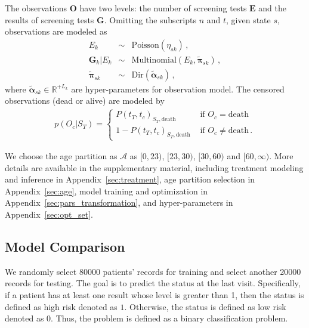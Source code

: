 \documentclass{article}
\begin{document}
The observations $\bm O$ have two levels: the number of screening tests $\bm E$ and the results of screening tests $\bm G$. Omitting the subscripts $n$ and $t$, given state $s$, observations are modeled as  
\begin{eqnarray*}
	E_k & \sim & \mathrm{Poisson}(\eta_{sk})\,, \nonumber \\
	{\bm G}_k|E_k & \sim & \mathrm{Multinomial}(E_k, \tilde{\bm\pi}_{sk})\,, \nonumber \\
	\tilde{\bm\pi}_{sk} & \sim & \mathrm{Dir}(\tilde{\bm\alpha}_{sk}) \,,
\end{eqnarray*}
where 
$\tilde{\bm \alpha}_{sk} \in \mathbb{R}^{+L_k}$ are hyper-parameters for observation model. The censored observations (dead or alive) are modeled by
\begin{eqnarray*}
	p(O_{c}|S_T) = \begin{cases}
		P(t_T, t_{c})_{S_T, \text{death}} & \text{ if } O_{c} = \mathrm{death}\\
		1-P(t_T, t_{c})_{S_T, \text{death}} &   \text{ if }  O_{c} \neq \mathrm{death}\,.
	\end{cases}
\end{eqnarray*}

We choose the age partition as $\mathcal{A}$ as $[0, 23)$, $[23,30)$, $[30,60)$ and $[60, \infty)$. More details are available in the supplementary material, including treatment modeling and inference in Appendix~\ref{sec:treatment}, age partition selection in Appendix~\ref{sec:age}, model training and optimization in Appendix~\ref{sec:pars_transformation}, and hyper-parameters in Appendix~\ref{sec:opt_set}.

\subsection{Model Comparison}
We randomly select 80000 patients' records for training and select another 20000 records for testing. The goal is to predict the status at the last visit. Specifically, if a patient has at least one result whose level is greater than 1, then the status is defined as high risk denoted as $1$. Otherwise, the status is defined as low risk denoted as $0$. Thus, the problem is defined as a binary classification problem. 
\end{document}
